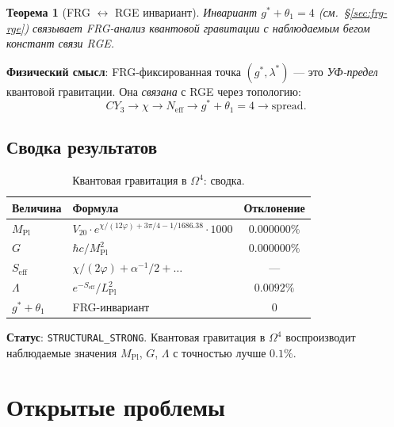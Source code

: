 \documentclass[11pt,a4paper]{article}
\newcommand{\CY}{\ensuremath{CY_3}}
\newcommand{\Om}{\ensuremath{\Omega^4}}
\newtheorem{theorem}{Теорема}[section]
\theoremstyle{definition}
\begin{document}
\begin{theorem}[FRG $\leftrightarrow$ RGE инвариант]
\label{thm:qg-frg-rge}
Инвариант $g^* + \theta_1 = 4$ (см.~\S\ref{sec:frg-rge})
связывает FRG-анализ квантовой гравитации с наблюдаемым
бегом констант связи RGE.
\end{theorem}

\medskip\noindent
\textbf{Физический смысл}: FRG-фиксированная точка $(g^*, \lambda^*)$
--- это \emph{УФ-предел} квантовой гравитации. Она
\emph{связана} с RGE через топологию:
\begin{equation}
    \CY \to \chi \to N_{\text{eff}} \to g^* + \theta_1 = 4
    \to \text{spread}.
\end{equation}

\subsection{Сводка результатов}
\label{subsec:qg-summary}

\begin{table}[ht]
\centering
\caption{Квантовая гравитация в \texorpdfstring{$\Om$}{}: сводка.}
\label{tab:qg-summary}
\begin{tabular}{llc}
\toprule
Величина & Формула & Отклонение \\
\midrule
$M_{\text{Pl}}$ & $V_{20} \cdot e^{\chi/(12\varphi) + 3\pi/4 - 1/1686.38} \cdot 1000$
    & $0.000000\%$ \\
$G$ & $\hbar c / M_{\text{Pl}}^2$ & $0.000000\%$ \\
$S_{\text{eff}}$ & $\chi/(2\varphi) + \alpha^{-1}/2 + \ldots$
    & --- \\
$\Lambda$ & $e^{-S_{\text{eff}}} / L_{\text{Pl}}^2$ & $0.0092\%$ \\
$g^* + \theta_1$ & FRG-инвариант & $0$ \\
\bottomrule
\end{tabular}
\end{table}

\medskip\noindent
\textbf{Статус}: \texttt{STRUCTURAL\_STRONG}. Квантовая
гравитация в $\Om$ воспроизводит наблюдаемые значения
$M_{\text{Pl}}$, $G$, $\Lambda$ с точностью лучше $0.1\%$.
\section{Открытые проблемы}
\label{sec:open}
\end{document}
